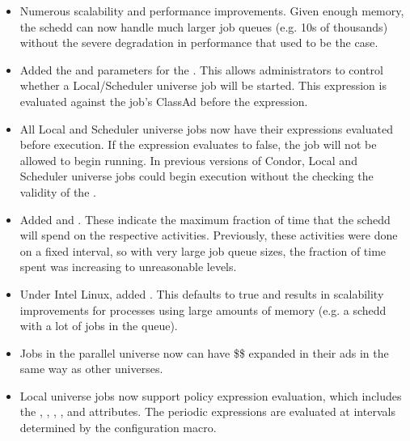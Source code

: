 \begin{itemize}

\item Numerous scalability and performance improvements.  Given enough
memory, the schedd can now handle much larger job queues (e.g. 10s of
thousands) without the severe degradation in performance that used to
be the case.

\item Added the  and 
parameters for the . This allows administrators to control whether
a Local/Scheduler universe job will be started. This expression is evaluated
against the job's ClassAd before the  expression.

\item All Local and Scheduler universe jobs now have their  
expressions evaluated before execution. If the expression evaluates to false, the
job will not be allowed to begin running. In previous versions of Condor, Local 
and Scheduler universe jobs could begin execution without the  checking
the validity of the .

\item Added  and
.  These indicate the maximum
fraction of time that the schedd will spend on the respective
activities.  Previously, these activities were done on a fixed
interval, so with very large job queue sizes, the fraction of time
spent was increasing to unreasonable levels.

\item Under Intel Linux, added .
This defaults to true and results in scalability improvements for processes
using large amounts of memory (e.g. a schedd with a lot of jobs in the queue).

\item Jobs in the parallel universe now can have \$\$ expanded in their
ads in the same way as other universes.

\item Local universe jobs now support policy expression evaluation, which includes
the , , ,
, and  attributes. The periodic
expressions are evaluated at intervals determined by the
 configuration macro.


\end{itemize}
